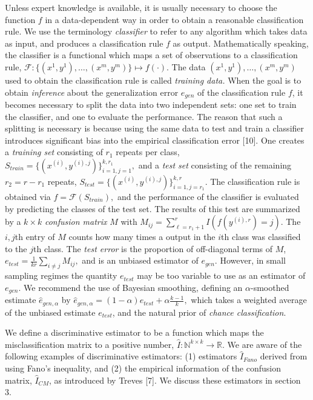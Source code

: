 \documentclass{article}
\begin{document}
Unless expert knowledge is available, it is usually necessary to
choose the function $f$ in a data-dependent way in order to obtain a
reasonable classification rule.  We use the terminology
\emph{classifier} to refer to any algorithm which takes data as input,
and produces a classification rule $f$ as output.  Mathematically
speaking, the classifier is a functional which maps a set of
observations to a classification rule, $ \mathcal{F}:
\{(x^{1},y^{1}),\hdots, (x^{m}, y^{m})\} \mapsto f(\cdot).  $ The data
$(x^1,y^1),\hdots, (x^m, y^m)$ used to obtain the classification rule
is called \emph{training data.}  When the goal is to obtain
\emph{inference} about the generalization error $e_{gen}$ of the
classification rule $f$, it becomes necessary to split the data into
two independent sets: one set to train the classifier, and one to
evaluate the performance.  The reason that such a splitting is
necessary is because using the same data to test and train a
classifier introduces significant bias into the empirical
classification error [10].  One creates a
\emph{training set} consisting of $r_1$ repeats per class, $ S_{train}
= \{(x^{(i)}, y^{(i),j})\}_{i=1, j=1}^{k, r_1}, $ and a \emph{test
  set} consisting of the remaining $r_2 = r - r_1$ repeats, $ S_{test}
= \{(x^{(i)}, y^{(i),j})\}_{i=1, j=r_1}^{k, r}.  $ The classification
rule is obtained via $ f = \mathcal{F}(S_{train}), $ and the
performance of the classifier is evaluated by predicting the classes
of the test set.  The results of this test are summarized by a $k
\times k$ \emph{confusion matrix} $M$ with $ M_{ij} = \sum_{\ell=r_1 +
  1}^r I(f(y^{(i), r}) = j).  $ The $i, j$th entry of $M$ counts how
many times a output in the $i$th class was classified to the $j$th
class.  The \emph{test error} is the proportion of off-diagonal terms
of $M$, $ e_{test} = \frac{1}{kr} \sum_{i \neq j} M_{ij}, $ and is an
unbiased estimator of $e_{gen}$.  However, in small sampling regimes
the quantity $e_{test}$ may be too variable to use as an estimator of
$e_{gen}$.  We recommend the use of Bayesian smoothing, defining an
$\alpha$-smoothed estimate $\hat{e}_{gen, \alpha}$ by $ \hat{e}_{gen,
  \alpha} = (1 - \alpha) e_{test} + \alpha \frac{k-1}{k}, $ which
takes a weighted average of the unbiased estimate $e_{test}$, and the
natural prior of \emph{chance classification}.

We define a discriminative estimator to be a function which maps the
misclassification matrix to a positive number, $ \hat{I}:
\mathbb{N}^{k \times k} \to \mathbb{R}.  $ We are aware of the
following examples of discriminative estimators: (1) estimators $\hat{I}_{Fano}$
derived from using Fano's inequality, and (2) the empirical
information of the confusion matrix, $\hat{I}_{CM}$, as introduced by Treves [7].
We discuss these estimators in section 3.
\end{document}
